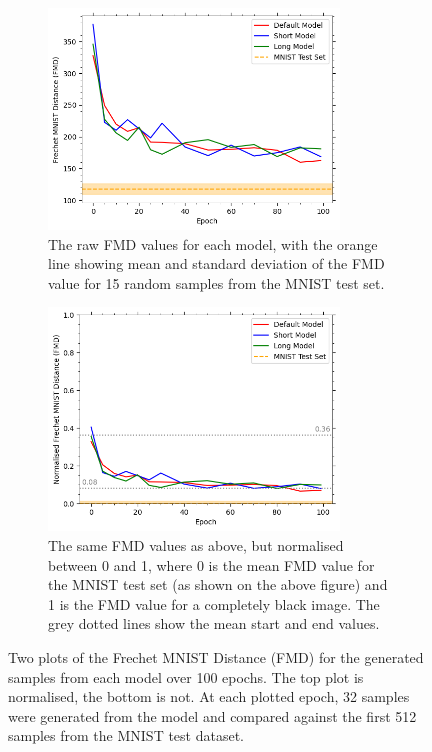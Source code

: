 \begin{figure}
\centering
\begin{subfigure}{0.8\textwidth}
    \centering
    \includegraphics[width=0.85\textwidth]{figures/q1b_fmd}
    \caption{The raw FMD values for each model, with the orange line showing mean and standard deviation of
        the FMD value for 15 random samples from the MNIST test set.}
    \label{fig:q1b_fmd_not_norm}
\end{subfigure}%
\hfill
\begin{subfigure}{0.8\textwidth}
    \centering
    \includegraphics[width=0.85\textwidth]{./figures/q1b_fmd_normalised}
    \caption{The same FMD values as above, but normalised between 0 and 1, where 0 is the mean FMD value for the MNIST
        test set (as shown on the above figure) and 1 is the FMD value for a completely black image.
        The grey dotted lines show the mean start and end values.}
    \label{fig:q1b_fmd_normalised}
\end{subfigure}
\caption{Two plots of the Frechet MNIST Distance (FMD) for the generated samples from each model over 100 epochs.
        The top plot is normalised, the bottom is not.
        At each plotted epoch, 32 samples were generated from the model and compared against the first 512 samples from the
        MNIST test dataset.}
\label{fig:q1b_fmd}
\end{figure}

